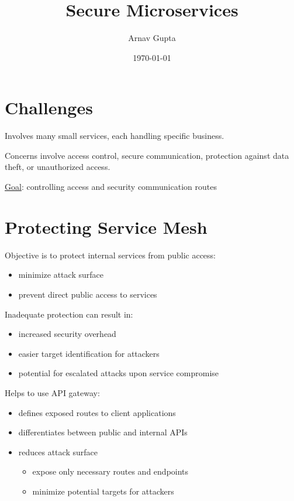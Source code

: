 \documentclass[11pt]{article}
\author{Arnav Gupta}
\date{\today}
\title{Secure Microservices}
\begin{document}
\maketitle
\tableofcontents

\section{Challenges}
\label{sec:orgd6c1c5a}
Involves many small services, each handling specific business.

Concerns involve access control, secure communication, protection
against data theft, or unauthorized access.

\uline{Goal}: controlling access and security communication routes
\section{Protecting Service Mesh}
\label{sec:org779f725}
Objective is to protect internal services from public access:
\begin{itemize}
\item minimize attack surface
\item prevent direct public access to services
\end{itemize}

Inadequate protection can result in:
\begin{itemize}
\item increased security overhead
\item easier target identification for attackers
\item potential for escalated attacks upon service compromise
\end{itemize}

Helps to use API gateway:
\begin{itemize}
\item defines exposed routes to client applications
\item differentiates between public and internal APIs
\item reduces attack surface
\begin{itemize}
\item expose only necessary routes and endpoints
\item minimize potential targets for attackers
\end{itemize}
\end{itemize}
\end{document}
